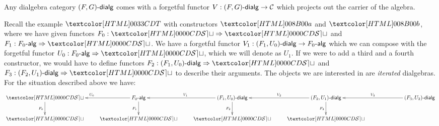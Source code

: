 \begin{remark}
  Any dialgebra category $\dialgcat{F}{G}$ comes with a forgetful
  functor $V : \dialgcat{F}{G} \to \Cc$ which projects out the carrier
  of the algebra.
\end{remark}

Recall the example $\Tty$ with constructors $\Ta$ and $\Tb$, where we
have given functors $F_0 : \Func{\SET}{\SET}$ and
$F_1 : \Func{\algcat{F_0}}{\SET}$. We have a forgetful functor
$V_1 : \dialgcat{F_1}{U_0} \to \algcat{F_0}$ which we can compose with
the forgetful functor $U_0 : \Func{\algcat{F_0}}{\SET}$, which we will
denote as $U_1$. If we were to add a third and a fourth constructor,
we would have to define functors
$F_2 : \Func{\dialgcat{F_1}{U_0}}{\SET}$ and
$F_3 : \Func{\dialgcat{F_2}{U_1}}{\SET}$ to describe their
arguments. The objects we are interested in are \emph{iterated}
dialgebras. For the situation described above we have:
$$
\xymatrix@!C{
\SET 
\ar[d]_{F_0}
&\algcat{F_0} 
\ar[d]_{F_1}
\ar[l]_{U_0}
&\dialgcat{F_1}{U_0}
\ar[d]_{F_2}
\ar[l]_{V_1}
&\dialgcat{F_2}{U_1}
\ar[d]_{F_3}
\ar[l]_{V_2}
&\dialgcat{F_3}{U_2}
\ar[l]_{V_3}
\\
\SET
&\SET
&\SET
&\SET
&
}
$$

